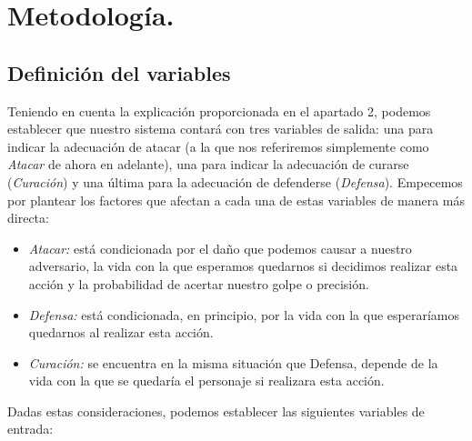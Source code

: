 \section{Metodología.}
\subsection{Definición del variables}
Teniendo en cuenta la explicación proporcionada en el apartado 2, podemos establecer que nuestro sistema contará con tres variables de salida: una para indicar la adecuación de atacar (a la que nos referiremos simplemente como \textit{Atacar} de ahora en adelante), una para indicar la adecuación de curarse (\textit{Curación}) y una última para la adecuación de defenderse (\textit{Defensa}).
Empecemos por plantear los factores que afectan a cada una de estas variables de manera más directa:
\begin{itemize}
	\item \textit{Atacar:} está condicionada por el daño que podemos causar a nuestro adversario, la vida con la que esperamos quedarnos si decidimos realizar esta acción y la probabilidad de acertar nuestro golpe o precisión.
	\item \textit{Defensa:} está condicionada, en principio, por la vida con la que esperaríamos quedarnos al realizar esta acción.
	\item \textit{Curación:} se encuentra en la misma situación que Defensa, depende de la vida con la que se quedaría el personaje si realizara esta acción.
\end{itemize}

Dadas estas consideraciones, podemos establecer las siguientes variables de entrada:

